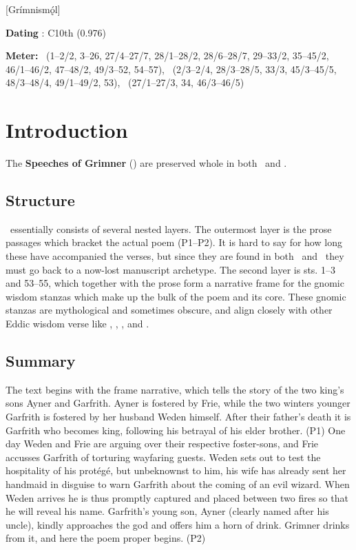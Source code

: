 [Grímnismǫ́l]
\def\thisBookCode{Grimnismal}

\begin{flushright}%
\textbf{Dating} \parencite{Sapp2022}: C10th (0.976)

\textbf{Meter:} \Ljodahattr\ (1–2/2, 3–26, 27/4–27/7, 28/1–28/2, 28/6–28/7, 29–33/2, 35–45/2, 46/1–46/2, 47–48/2, 49/3–52, 54–57), \Fornyrdislag\ (2/3–2/4, 28/3–28/5, 33/3, 45/3–45/5, 48/3–48/4, 49/1–49/2, 53), \Galdralag\ (27/1–27/3, 34, 46/3–46/5)%
\end{flushright}

\section{Introduction}

The \textbf{Speeches of Grimner} (\Grimnismal) are preserved whole in both \Regius\ and \AM.

\subsection{Structure}

\Grimnismal\ essentially consists of several nested layers.  The outermost layer is the prose passages which bracket the actual poem (P1–P2).  It is hard to say for how long these have accompanied the verses, but since they are found in both \Regius\ and \AM\ they must go back to a now-lost manuscript archetype.  The second layer is sts. 1–3 and 53–55, which together with the prose form a narrative frame for the gnomic wisdom stanzas which make up the bulk of the poem and its core.  These gnomic stanzas are mythological and sometimes obscure, and align closely with other Eddic wisdom verse like \Havamal, \Vafthrudnismal, \Sigrdrifumal, and \Alvissmal.

\subsection{Summary}
The text begins with the frame narrative, which tells the story of the two king’s sons Ayner and Garfrith.  Ayner is fostered by Frie, while the two winters younger Garfrith is fostered by her husband Weden himself.  After their father’s death it is Garfrith who becomes king, following his betrayal of his elder brother. (P1)  One day Weden and Frie are arguing over their respective foster-sons, and Frie accusses Garfrith of torturing wayfaring guests.  Weden sets out to test the hospitality of his protégé, but unbeknownst to him, his wife has already sent her handmaid in disguise to warn Garfrith about the coming of an evil wizard.  When Weden arrives he is thus promptly captured and placed between two fires so that he will reveal his name.  Garfrith’s young son, Ayner (clearly named after his uncle), kindly approaches the god and offers him a horn of drink.  Grimner drinks from it, and here the poem proper begins. (P2)

